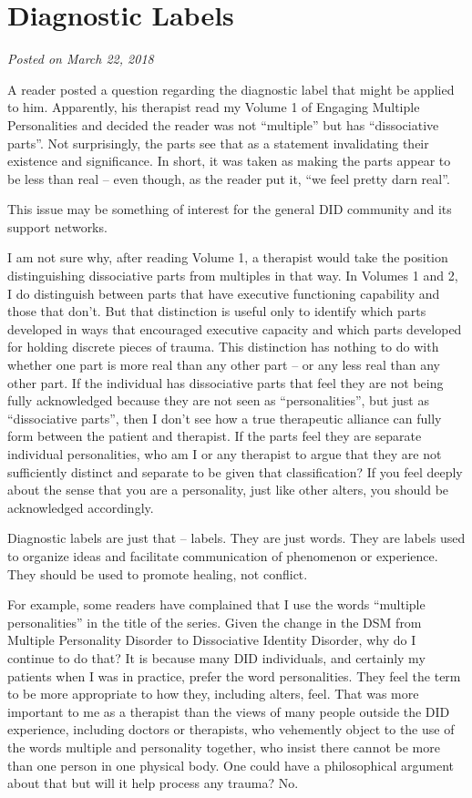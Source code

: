 \documentclass[]{book}
\begin{document}
\hypertarget{diagnostic-labels}{%
\section{Diagnostic Labels}\label{diagnostic-labels}}

\emph{Posted on March 22, 2018}

A reader posted a question regarding the diagnostic label that might be applied to him. Apparently, his therapist read my Volume 1 of Engaging Multiple Personalities and decided the reader was not ``multiple'' but has ``dissociative parts''. Not surprisingly, the parts see that as a statement invalidating their existence and significance. In short, it was taken as making the parts appear to be less than real -- even though, as the reader put it, ``we feel pretty darn real''.

This issue may be something of interest for the general DID community and its support networks.

I am not sure why, after reading Volume 1, a therapist would take the position distinguishing dissociative parts from multiples in that way. In Volumes 1 and 2, I do distinguish between parts that have executive functioning capability and those that don't. But that distinction is useful only to identify which parts developed in ways that encouraged executive capacity and which parts developed for holding discrete pieces of trauma. This distinction has nothing to do with whether one part is more real than any other part -- or any less real than any other part. If the individual has dissociative parts that feel they are not being fully acknowledged because they are not seen as ``personalities'', but just as ``dissociative parts'', then I don't see how a true therapeutic alliance can fully form between the patient and therapist. If the parts feel they are separate individual personalities, who am I or any therapist to argue that they are not sufficiently distinct and separate to be given that classification? If you feel deeply about the sense that you are a personality, just like other alters, you should be acknowledged accordingly.

Diagnostic labels are just that -- labels. They are just words. They are labels used to organize ideas and facilitate communication of phenomenon or experience. They should be used to promote healing, not conflict.

For example, some readers have complained that I use the words ``multiple personalities'' in the title of the series. Given the change in the DSM from Multiple Personality Disorder to Dissociative Identity Disorder, why do I continue to do that? It is because many DID individuals, and certainly my patients when I was in practice, prefer the word personalities. They feel the term to be more appropriate to how they, including alters, feel. That was more important to me as a therapist than the views of many people outside the DID experience, including doctors or therapists, who vehemently object to the use of the words multiple and personality together, who insist there cannot be more than one person in one physical body. One could have a philosophical argument about that but will it help process any trauma? No.
\end{document}
